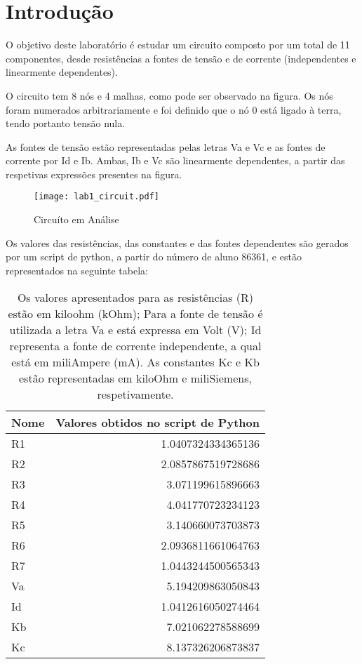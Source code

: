 \section{Introdução}
\label{sec:introdução}

\par O objetivo deste laboratório é estudar um circuito composto por um total de 11 componentes, desde resistências a fontes de tensão e de corrente (independentes e linearmente dependentes). \par
O circuito tem 8 nós e 4 malhas, como pode ser observado na figura. Os nós foram numerados arbitrariamente e foi definido que o nó 0 está ligado à terra, tendo portanto tensão nula.\par
As fontes de tensão estão representadas pelas letras Va e Vc e as fontes de corrente por Id e Ib. Ambas, Ib e Vc são linearmente dependentes, a partir das respetivas expressões presentes na figura.

\begin{figure}[h] \centering
\texttt{[image: lab1\_circuit.pdf]}
\caption{Circuíto em Análise}
\label{fig:lab1_circuit}
\end{figure}

Os valores das resistências, das constantes e das fontes dependentes são gerados por um script de python, a partir do número de aluno 86361, e estão representados na seguinte tabela:

\begin{table}[h]
  \centering
  \begin{tabular}{|l|r|}
    \hline    
    {\bf Nome} & {\bf Valores obtidos no script de Python} \\ \hline
	R1 &  1.0407324334365136\\ \hline
	R2 &  2.0857867519728686\\ \hline
	R3 &  3.071199615896663  \\ \hline
	R4 &  4.041770723234123 \\ \hline
	R5 &  3.140660073703873\\ \hline
	R6 &  2.0936811661064763 \\ \hline
	R7 &  1.0443244500565343  \\ \hline
	Va &  5.194209863050843 \\ \hline
	Id &  1.0412616050274464 \\ \hline
	Kb &  7.021062278588699\\ \hline
	Kc &  8.137326206873837\\ 
	\hline

  \end{tabular}
  \caption{Os valores apresentados para as resistências (R) estão em kiloohm (kOhm); Para a fonte de tensão é utilizada a letra Va e está expressa em Volt (V); Id representa a fonte de corrente independente, a qual está em  miliAmpere (mA). As constantes Kc e Kb estão representadas em kiloOhm e miliSiemens, respetivamente.}
  \label{tab:python_values}
\end{table}


